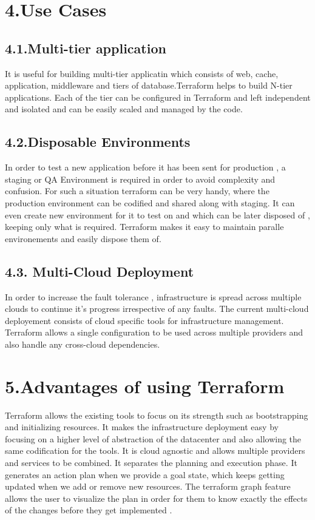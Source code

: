\documentclass[9pt,twocolumn,twoside]{../../styles/osajnl}
\begin{document}
\section{4.Use Cases}

\subsection{4.1.Multi-tier application}

It is useful for building multi-tier applicatin which consists of web,
cache, application, middleware and tiers of database.Terraform helps
to build N-tier applications. Each of the tier can be configured in
Terraform and left independent and isolated and can be easily scaled
and managed by the code\cite{www-terraform-book}.


\subsection{4.2.Disposable Environments}

In order to test a new application before it has been sent for
production , a staging or QA Environment is required in order to avoid
complexity and confusion. For such a situation terraform can be very
handy, where the production environment can be codified and shared
along with staging. It can even create new environment for it to test
on and which can be later disposed of , keeping only what is
required. Terraform makes it easy to maintain paralle environements
and easily dispose them of\cite{www-terraform-book}.

\subsection{4.3. Multi-Cloud Deployment}

In order to increase the fault tolerance , infrastructure is spread
across multiple clouds to continue it's progress irrespective of any
faults. The current multi-cloud deployement consists of cloud specific
tools for infrastructure management. Terraform allows a single
configuration to be used across multiple providers and also handle any
cross-cloud dependencies\cite{www-terraform}.

\section{5.Advantages of using Terraform}

Terraform allows the existing tools to focus on its strength such as
bootstrapping and initializing resources. It makes the infrastructure
deployment easy by focusing on a higher level of abstraction of the
datacenter and also allowing the same codification for the tools. It
is cloud agnostic and allows multiple providers and services to be
combined. It separates the planning and execution phase. It generates
an action plan when we provide a goal state, which keeps getting
updated when we add or remove new resources. The terraform graph
feature allows the user to visualize the plan in order for them to
know exactly the effects of the changes before they get implemented
\cite{www-terraform-othersoftware}.
\end{document}
